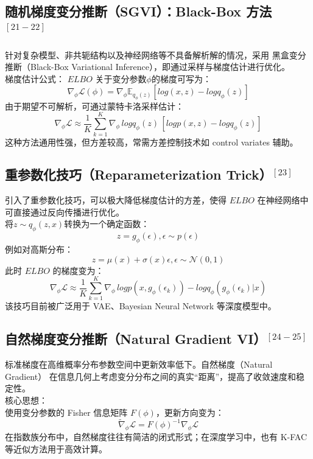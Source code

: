 \documentclass[final]{ws-ijseke}
\begin{document}
\subsection{随机梯度变分推断（SGVI）：Black-Box 方法$^{[21-22]}$}
\hspace*{2em} 针对复杂模型、非共轭结构以及神经网络等不具备解析解的情况，采用 黑盒变分推断（Black-Box Variational Inference），即通过采样与梯度估计进行优化。\\
梯度估计公式：
$ELBO$ 关于变分参数$\phi$的梯度可写为：
\begin{equation*}
\nabla_\phi \mathcal L(\phi) = \nabla_\phi \mathbb{E}_{q_\phi(z)}[log(x,z)-logq_\phi (z)]
\end{equation*}
由于期望不可解析，可通过蒙特卡洛采样估计：
\begin{equation*}
\nabla_\phi \mathcal L \approx \frac{1}{K}\sum_{k=1}^K  \nabla_\phi \,logq_\phi (z)\, [logp(x,z)-logq_\phi (z)]
\end{equation*}
这种方法通用性强，但方差较高，常需方差控制技术如 control variates 辅助。
\subsection{重参数化技巧（Reparameterization Trick）$^{[23]}$}
\hspace*{2em} 引入了重参数化技巧，可以极大降低梯度估计的方差，使得 $ELBO$ 在神经网络中可直接通过反向传播进行优化。\\
将$z\sim q_\phi(z,x)$转换为一个确定函数：
\begin{equation*}
z = g_\phi(\epsilon),\epsilon\sim p(\epsilon)
\end{equation*}
例如对高斯分布：
\begin{equation*}
z = \mu(x)+\sigma(x)\epsilon,\epsilon\sim \mathcal N(0,1)
\end{equation*}
此时 $ELBO$ 的梯度变为：
\begin{equation*}
\nabla_\phi \mathcal L \approx \frac{1}{K}\sum_{k=1}^K  \nabla_\phi \,logp(x,g_\phi(\epsilon_k))-logq_\phi(g_\phi(\epsilon_k)|x)
\end{equation*}
该技巧目前被广泛用于 VAE、Bayesian Neural Network 等深度模型中。
\subsection{自然梯度变分推断（Natural Gradient VI）$^{[24-25]}$}
\hspace*{2em} 标准梯度在高维概率分布参数空间中更新效率低下。自然梯度（Natural Gradient） 在信息几何上考虑变分分布之间的真实“距离”，提高了收敛速度和稳定性。\\
核心思想：\\
使用变分参数的 Fisher 信息矩阵 $F(\phi)$，更新方向变为：
\begin{equation*}
\tilde\nabla_\phi \mathcal L = F(\phi)^{-1}\nabla_\phi \mathcal L
\end{equation*}
\hspace*{2em} 在指数族分布中，自然梯度往往有简洁的闭式形式；在深度学习中，也有 K-FAC 等近似方法用于高效计算。
\end{document}
